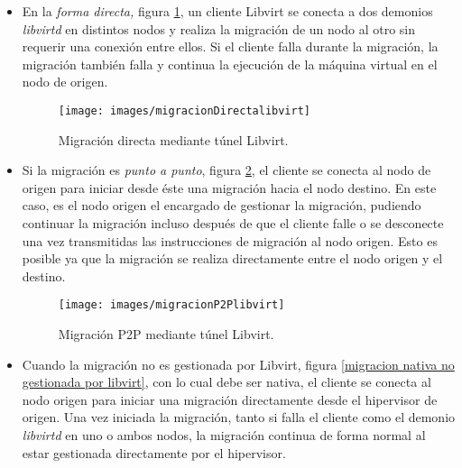 \documentclass[spanisheDIVcalc,twoside,parskip-,pointlessnumbers,final]{scrbook}
\begin{document}
\begin{itemize}
\item En la \emph{forma directa, }figura \ref{migracion directa mediante tunel},
un cliente Libvirt se conecta a dos demonios \emph{libvirtd} en distintos
nodos y realiza la migración de un nodo al otro sin requerir una conexión
entre ellos. Si el cliente falla durante la migración, la migración
también falla y continua la ejecución de la máquina virtual en el
nodo de origen. 


\begin{figure}[htpb]
\begin{centering}
\texttt{[image: images/migracionDirectalibvirt]}
\par\end{centering}

\caption{Migración directa mediante túnel Libvirt.}
\label{migracion directa mediante tunel}

\end{figure}


\item Si la migración es \emph{punto a punto}, figura \ref{migracion p2p mediante tunel},
el cliente se conecta al nodo de origen para iniciar desde éste una
migración hacia el nodo destino. En este caso, es el nodo origen el
encargado de gestionar la migración, pudiendo continuar la migración
incluso después de que el cliente falle o se desconecte una vez transmitidas
las instrucciones de migración al nodo origen. Esto es posible ya
que la migración se realiza directamente entre el nodo origen y el
destino.


\begin{figure}[htpb]
\begin{centering}
\texttt{[image: images/migracionP2Plibvirt]}
\par\end{centering}

\caption{Migración P2P mediante túnel Libvirt.}
\label{migracion p2p mediante tunel}

\end{figure}


\item Cuando la migración no es gestionada por Libvirt, figura \ref{migracion nativa no gestionada por libvirt},
con lo cual debe ser nativa, el cliente se conecta al nodo origen
para iniciar una migración directamente desde el hipervisor de origen.
Una vez iniciada la migración, tanto si falla el cliente como el demonio
\emph{libvirtd} en uno o ambos nodos, la migración continua de forma
normal al estar gestionada directamente por el hipervisor.



\end{itemize}
\end{document}
